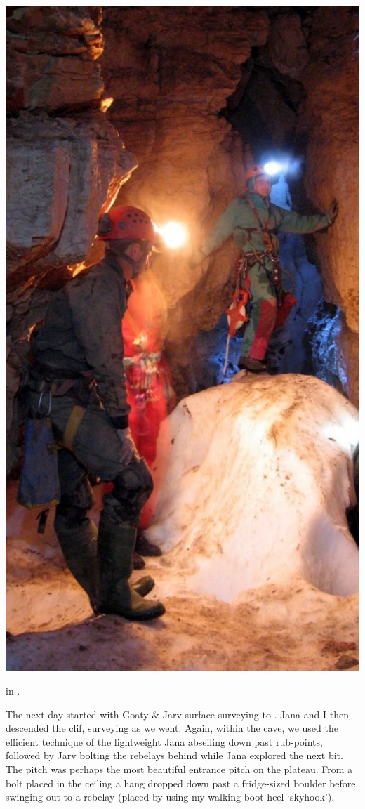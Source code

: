 \begin{marginfigure}
\centering 
  \includegraphics[width=\linewidth]{2007/b9/jarvist frost - planika - acre lane--orig.jpg}
  \caption{ in . }
\end{marginfigure}

The next day started with Goaty \& Jarv surface surveying to . Jana
and I then descended the clif, surveying as we went. Again, within the
cave, we used the efficient technique of the lightweight Jana abseiling
down past rub-points, followed by Jarv bolting the rebelays behind while
Jana explored the next bit. The pitch was perhaps the most beautiful
entrance pitch on the  plateau. From a bolt placed in the ceiling a
hang dropped down past a fridge-sized boulder before swinging out to a
rebelay (placed by using my walking boot heel `skyhook'). 

